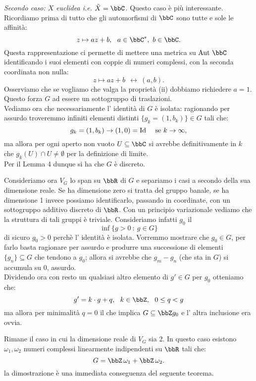 {\it Secondo caso: $X$ euclidea i.e. $\tilde{X}=\bbC$.} Questo caso è più interessante. Ricordiamo prima di tutto che gli automorfismi di $\bbC$ sono tutte e sole le affinità:
$$
z\mapsto az+b,\ \ a\in\bbC^*,\ b\in \bbC.
$$
Questa rappresentazione ci permette di mettere una metrica su $\Aut{\bbC}$ identificando i suoi elementi con coppie di numeri complessi, con la seconda coordinata non nulla:
$$
z\mapsto az+b\ \ \leftrightarrow\  (a,b).
$$
Osserviamo che se vogliamo che valga la proprietà (ii) dobbiamo richiedere $a=1$. Questo forza $G$ ad essere un sottogruppo di traslazioni.\\
Vediamo ora che necessariamente l' identità di $G$ è isolata: ragionando per assurdo troveremmo infiniti elementi distinti $\{ g_k=(1,b_k) \}\in G$ tali che:
$$
g_k=(1,b_k)\rightarrow (1,0)=\Id\ \ \ \mbox{ se } k \rightarrow \infty,
$$
ma allora per ogni aperto non vuoto $U\subseteq \bbC$ si avrebbe definitivamente in $k$ che $g_k(U)\cap U\neq \emptyset$ per la definizione di limite.\\
Per il Lemma 4 dunque si ha che $G$ è discreto.

Consideriamo ora $V_G$ lo span su $\bbR$ di $G$ e separiamo i casi a secondo della sua dimensione reale. Se ha dimensione zero si tratta del gruppo banale, se ha dimensione 1 invece possiamo identificarlo, passando in coordinate, con un sottogruppo additivo discreto di $\bbR$. Con un principio variazionale vediamo che la struttura di tali gruppi è triviale. Consideriamo infatti $g_0$ il
$$
\inf\{g>0\ :\ g\in G\}
$$
di sicuro $g_0>0$ perchè l' identità è isolata. Vorremmo mostrare che $g_0\in G$, per farlo basta ragionare per assurdo e produrre una successione di elementi $\{g_n\}\subseteq G $ che tendono a $g_0$; allora si avrebbe che $g_m-g_n$ (che sta in $G$) si accumula su $0$, assurdo.\\
Dividendo ora con resto un qualsiasi altro elemento di $g'\in G$ per $g_0$ otteniamo che:
$$
g'=k\cdot g+q,\ \ k\in \bbZ,\ \ 0\leq q <g
$$
ma allora per minimalità $q=0$ il che implica $G\subseteq \bbZ g_0$ e l' altra inclusione era ovvia.

Rimane il caso in cui la dimensione reale di $V_G$ sia 2. In questo caso esistono $\omega_1,\omega_2$ numeri complessi linearmente indipendenti su $\bbR$ tali che:
$$
G=\bbZ\, \omega_1+\bbZ\, \omega_2.
$$
la dimostrazione è una immediata conseguenza del seguente teorema.

